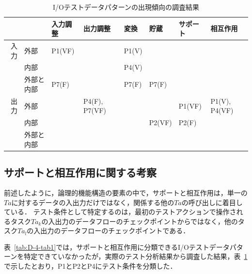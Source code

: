 \begin{table}[htbp]
  \centering
  \caption{I/Oテストデータパターンの出現傾向の調査結果}
    \begin{tabular}{|r|p{3em}|p{4em}|p{4em}|p{2.6em}|p{2.6em}|p{4em}|p{4em}|}
    \hline
          & \multicolumn{1}{l|}{} & \multicolumn{1}{p{4em}|}{入力調整} & \multicolumn{1}{p{4em}|}{出力調整} & \multicolumn{1}{p{3em}|}{変換} & \multicolumn{1}{p{3em}|}{貯蔵} & \multicolumn{1}{p{4em}|}{サポート} & \multicolumn{1}{p{4em}|}{相互作用} \bigstrut\\
    \hline
    \hline
    \multicolumn{1}{|p{1.3em}|}{入力} & 外部 & P1(VF) &       & P1(V) &       &       &  \bigstrut\\
\cline{2-8}          & 内部 &       &       & P4(V) &       &       &  \bigstrut\\
\cline{2-8}          & 外部と内部 & \multicolumn{1}{p{4em}|}{P7(F)} &       & \multicolumn{1}{p{4em}|}{P7(F)} & \multicolumn{1}{p{4em}|}{P7(F)} &       &  \bigstrut\\
    \hline
    \multicolumn{1}{|p{1.3em}|}{出力}  & 外部 &       & \multicolumn{1}{|p{3em}|}{P4(F), P7(VF)} &       &       & P1(VF) & \multicolumn{1}{|p{3em}|}{P1(V), P4(VF)} \bigstrut\\
\cline{2-8}          & 内部 &       &       &       & \multicolumn{1}{p{4em}|}{P2(VF)} & P2(F) &  \bigstrut\\
\cline{2-8}\cline{8-8}          & 外部と内部 &       &       &       &       &       &  \bigstrut\\
    \hline
    \end{tabular}%
  \label{tab:ioresult}%
\end{table}%

\subsection{サポートと相互作用に関する考察}
前述したように，論理的機能構造の要素の中で，サポートと相互作用は，単一の$Ta$に対するデータの入出力だけではなく，関係する他の$Ta$の呼び出しに着目している．
テスト条件として特定するのは，最初のテストアクションで操作されるタスク$Ta_k$の入出力のデータフローのチェックポイントからではなく，他のタスク$Ta_l$の入出力のデータフローのチェックポイントである．

表~\ref{tab:D-4-tab1}では，サポートと相互作用に分類できるI/Oテストデータパターンを特定できていなかったが，実際のテスト分析結果から調査した結果，表~\ref{tab:ioresult}で示したとおり，P1とP2とP4にテスト条件を分類した．

